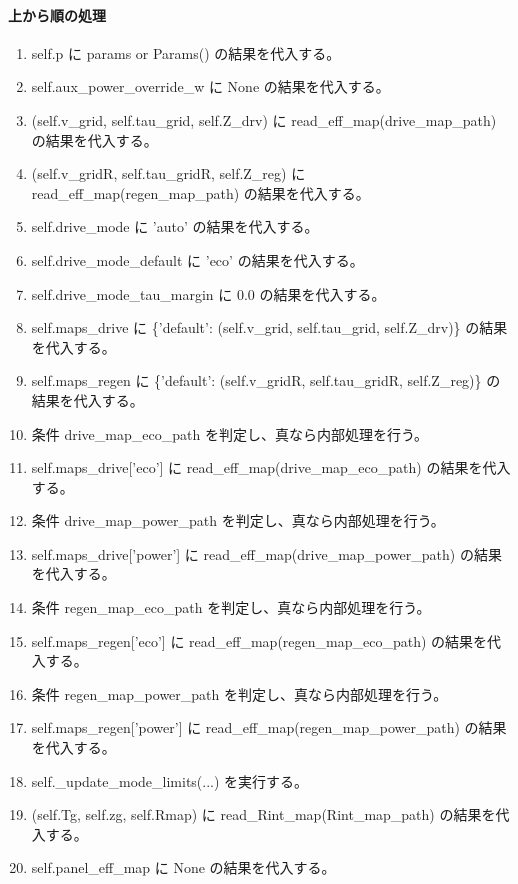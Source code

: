 \documentclass[a4paper,11pt]{article}
\begin{document}
            \paragraph{上から順の処理}
            \begin{enumerate}[leftmargin=1.8em]
            \item self.p に params or Params() の結果を代入する。
\item self.aux\_power\_override\_w に None の結果を代入する。
\item (self.v\_grid, self.tau\_grid, self.Z\_drv) に read\_eff\_map(drive\_map\_path) の結果を代入する。
\item (self.v\_gridR, self.tau\_gridR, self.Z\_reg) に read\_eff\_map(regen\_map\_path) の結果を代入する。
\item self.drive\_mode に 'auto' の結果を代入する。
\item self.drive\_mode\_default に 'eco' の結果を代入する。
\item self.drive\_mode\_tau\_margin に 0.0 の結果を代入する。
\item self.maps\_drive に \{'default': (self.v\_grid, self.tau\_grid, self.Z\_drv)\} の結果を代入する。
\item self.maps\_regen に \{'default': (self.v\_gridR, self.tau\_gridR, self.Z\_reg)\} の結果を代入する。
\item 条件 drive\_map\_eco\_path を判定し、真なら内部処理を行う。
\item   self.maps\_drive['eco'] に read\_eff\_map(drive\_map\_eco\_path) の結果を代入する。
\item 条件 drive\_map\_power\_path を判定し、真なら内部処理を行う。
\item   self.maps\_drive['power'] に read\_eff\_map(drive\_map\_power\_path) の結果を代入する。
\item 条件 regen\_map\_eco\_path を判定し、真なら内部処理を行う。
\item   self.maps\_regen['eco'] に read\_eff\_map(regen\_map\_eco\_path) の結果を代入する。
\item 条件 regen\_map\_power\_path を判定し、真なら内部処理を行う。
\item   self.maps\_regen['power'] に read\_eff\_map(regen\_map\_power\_path) の結果を代入する。
\item self.\_update\_mode\_limits(...) を実行する。
\item (self.Tg, self.zg, self.Rmap) に read\_Rint\_map(Rint\_map\_path) の結果を代入する。
\item self.panel\_eff\_map に None の結果を代入する。

\end{enumerate}
\end{document}
